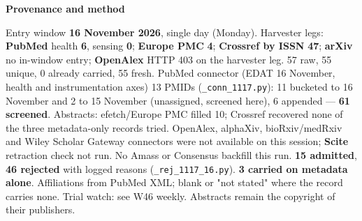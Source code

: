 \documentclass[10pt]{article}
\begin{document}


\vspace{2mm}

\begin{keybox}
{\sffamily\bfseries\footnotesize\color{Deep}Provenance and method}\\[1.2mm]
{\fontsize{7.2}{8.8}\selectfont
Entry window \textbf{16 November 2026}, single day (Monday). Harvester legs: \textbf{PubMed} health \textbf{6}, sensing \textbf{0}; \textbf{Europe PMC} \textbf{4}; \textbf{Crossref by ISSN} \textbf{47}; \textbf{arXiv} no in-window entry; \textbf{OpenAlex} HTTP 403 on the harvester leg. 57 raw, 55 unique, 0 already carried, 55 fresh. PubMed connector (EDAT 16 November, health and instrumentation axes) 13 PMIDs (\texttt{\_conn\_1117.py}): 11 bucketed to 16 November and 2 to 15 November (unassigned, screened here), 6 appended --- \textbf{61 screened}. Abstracts: efetch/Europe PMC filled 10; Crossref recovered none of the three metadata-only records tried.
OpenAlex, alphaXiv, bioRxiv/medRxiv and Wiley Scholar Gateway connectors were not available on this session; \textbf{Scite} retraction check not run. No Amass or Consensus backfill this run.
\textbf{15 admitted}, \textbf{46 rejected} with logged reasons (\texttt{\_rej\_1117\_16.py}). \textbf{3 carried on metadata alone}. Affiliations from PubMed XML; blank or "not stated" where the record carries none. Trial watch: see W46 weekly.
Abstracts remain the copyright of their publishers.\par}
\end{keybox}
\end{document}
